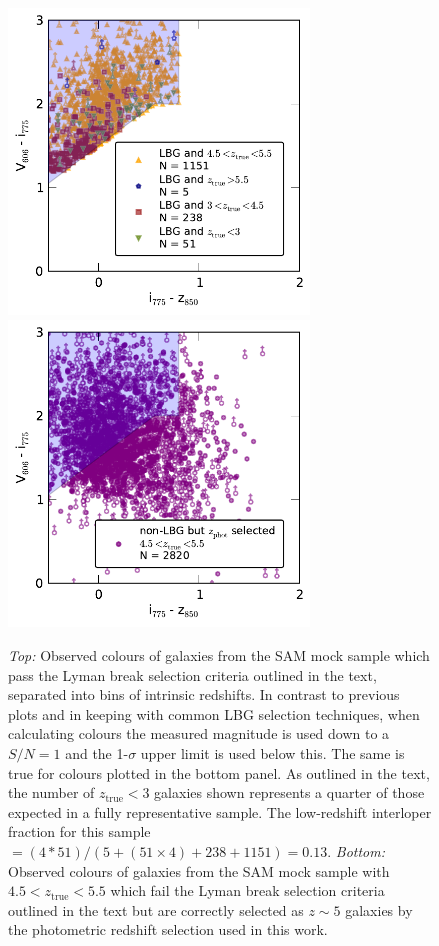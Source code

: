 \begin{figure}
\centering
\includegraphics[width=80mm]{plots/figA3a.pdf}
\includegraphics[width=80mm]{plots/figA3b.pdf}
\caption[Observed colours of galaxies from the SAM mock sample which pass and fail the Lyman break selection criteria.]{\emph{Top:} Observed colours of galaxies from the SAM mock sample which pass the Lyman break selection criteria outlined in the text, separated into bins of intrinsic redshifts. In contrast to previous plots and in keeping with common LBG selection techniques, when calculating colours the measured magnitude is used down to a $S/N = 1$ and the 1-$\sigma$ upper limit is used below this. The same is true for colours plotted in the bottom panel. As outlined in the text, the number of $z_{\text{true}} < 3$ galaxies shown represents a quarter of those expected in a fully representative sample. The low-redshift interloper fraction for this sample $= (4*51) / (5 + (51 \times 4) + 238 + 1151) = 0.13$. \emph{Bottom:} Observed colours of galaxies from the SAM mock sample with $4.5 < z_{\text{true}} < 5.5$ which fail the Lyman break selection criteria outlined in the text but are correctly selected as $z\sim5$ galaxies by the photometric redshift selection used in this work.}
\label{fig:mock_col_LBG}
\end{figure}


